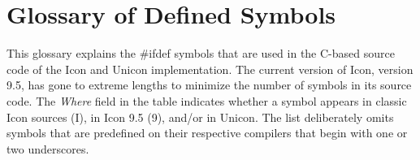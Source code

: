 \chapter{Glossary of Defined Symbols}

This glossary explains the \#ifdef symbols that are used in the
C-based source code of the Icon and Unicon implementation.  The
current version of Icon, version 9.5, has gone to extreme lengths
to minimize the number of symbols in its source code. The {\em Where\/}
field in the table indicates whether a symbol appears in classic Icon
sources (I), in Icon 9.5 (9), and/or in Unicon.
The list deliberately omits symbols that are predefined on their
respective compilers that begin with one or two underscores.

\bigskip


